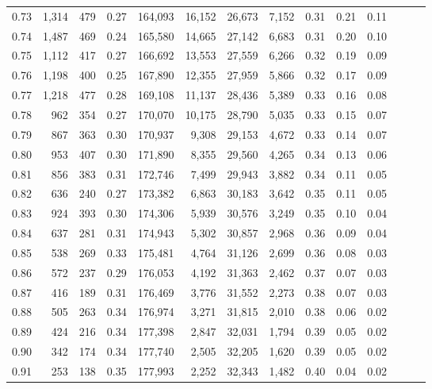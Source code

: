 \begin{tabular}{rrrrrrrrrrrrrr}
0.73 &  1,314 &  479 &  0.27 &  164,093 &   16,152 &  26,673 &   7,152 &  0.31 &  0.21 &      0.11 \\
0.74 &  1,487 &  469 &  0.24 &  165,580 &   14,665 &  27,142 &   6,683 &  0.31 &  0.20 &      0.10 \\
0.75 &  1,112 &  417 &  0.27 &  166,692 &   13,553 &  27,559 &   6,266 &  0.32 &  0.19 &      0.09 \\
0.76 &  1,198 &  400 &  0.25 &  167,890 &   12,355 &  27,959 &   5,866 &  0.32 &  0.17 &      0.09 \\
0.77 &  1,218 &  477 &  0.28 &  169,108 &   11,137 &  28,436 &   5,389 &  0.33 &  0.16 &      0.08 \\
0.78 &    962 &  354 &  0.27 &  170,070 &   10,175 &  28,790 &   5,035 &  0.33 &  0.15 &      0.07 \\
0.79 &    867 &  363 &  0.30 &  170,937 &    9,308 &  29,153 &   4,672 &  0.33 &  0.14 &      0.07 \\
0.80 &    953 &  407 &  0.30 &  171,890 &    8,355 &  29,560 &   4,265 &  0.34 &  0.13 &      0.06 \\
0.81 &    856 &  383 &  0.31 &  172,746 &    7,499 &  29,943 &   3,882 &  0.34 &  0.11 &      0.05 \\
0.82 &    636 &  240 &  0.27 &  173,382 &    6,863 &  30,183 &   3,642 &  0.35 &  0.11 &      0.05 \\
0.83 &    924 &  393 &  0.30 &  174,306 &    5,939 &  30,576 &   3,249 &  0.35 &  0.10 &      0.04 \\
0.84 &    637 &  281 &  0.31 &  174,943 &    5,302 &  30,857 &   2,968 &  0.36 &  0.09 &      0.04 \\
0.85 &    538 &  269 &  0.33 &  175,481 &    4,764 &  31,126 &   2,699 &  0.36 &  0.08 &      0.03 \\
0.86 &    572 &  237 &  0.29 &  176,053 &    4,192 &  31,363 &   2,462 &  0.37 &  0.07 &      0.03 \\
0.87 &    416 &  189 &  0.31 &  176,469 &    3,776 &  31,552 &   2,273 &  0.38 &  0.07 &      0.03 \\
0.88 &    505 &  263 &  0.34 &  176,974 &    3,271 &  31,815 &   2,010 &  0.38 &  0.06 &      0.02 \\
0.89 &    424 &  216 &  0.34 &  177,398 &    2,847 &  32,031 &   1,794 &  0.39 &  0.05 &      0.02 \\
0.90 &    342 &  174 &  0.34 &  177,740 &    2,505 &  32,205 &   1,620 &  0.39 &  0.05 &      0.02 \\
0.91 &    253 &  138 &  0.35 &  177,993 &    2,252 &  32,343 &   1,482 &  0.40 &  0.04 &      0.02 \\

\end{tabular}
